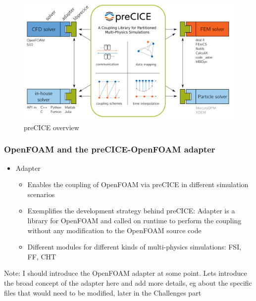 \begin{figure}[t]
	\centering
	\includegraphics[width=0.9 \textwidth]{images/precice-overview.png}
	\caption{preCICE overview \cite{Chourdakis:2022}}
	\label{fig:precice:overview}
\end{figure}


\subsubsection{OpenFOAM and the preCICE-OpenFOAM adapter}
\begin{itemize}
	\begin{itemize}
		\item Popular open-source PDE tool in academia and industry
		\item Enables the use and modification of different solvers
		\item Used mainly for CFD but also FEM simulations 
	\end{itemize}
	\item Adapter
	\begin{itemize}
		\item Enables the coupling of OpenFOAM via preCICE in different simulation scenarios
		\item Exemplifies the development strategy behind preCICE: Adapter is a library for OpenFOAM and called on runtime to perform the coupling without any modification to the OpenFOAM source code
		\item Different modules for different kinds of multi-physics simulations: FSI, FF, CHT
	\end{itemize}
\end{itemize}	
Note:
I should introduce the OpenFOAM adapter at some point.
Lets introduce the broad concept of the adapter here and add more details, eg about the specific files that would need to be modified, later in the Challenges part
\newline
